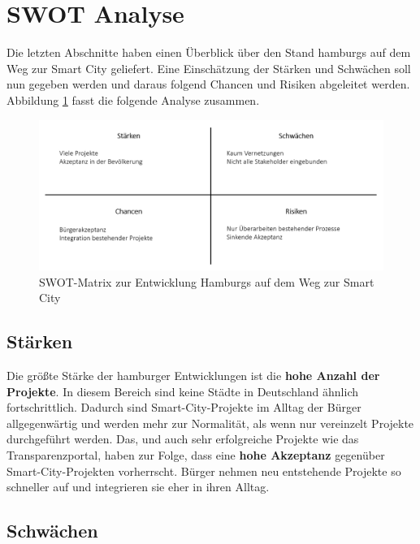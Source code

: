 \section{SWOT Analyse}
\label{sec:swot_analyse}

Die letzten Abschnitte haben einen Überblick über den Stand hamburgs auf dem Weg zur Smart City geliefert. Eine Einschätzung der Stärken und Schwächen soll nun gegeben werden und daraus folgend Chancen und Risiken abgeleitet werden. Abbildung \ref{fig:5_swot_matrix} fasst die folgende Analyse zusammen.

\begin{figure}[h]
	\includegraphics[width=\textwidth]{graphics/5-swot-matrix}
	\caption[SWOT-Matrix zur Entwicklung Hamburgs auf dem Weg zur Smart City]{SWOT-Matrix zur Entwicklung Hamburgs auf dem Weg zur Smart City}
	\label{fig:5_swot_matrix}
\end{figure}

\subsection{Stärken}

Die größte Stärke der hamburger Entwicklungen ist die \textbf{hohe Anzahl der Projekte}. In diesem Bereich sind keine Städte in Deutschland ähnlich fortschrittlich. Dadurch sind Smart-City-Projekte im Alltag der Bürger allgegenwärtig und werden mehr zur Normalität, als wenn nur vereinzelt Projekte durchgeführt werden. Das, und auch sehr erfolgreiche Projekte wie das Transparenzportal, haben zur Folge, dass eine \textbf{hohe Akzeptanz }gegenüber Smart-City-Projekten vorherrscht. Bürger nehmen neu entstehende Projekte so schneller auf und integrieren sie eher in ihren Alltag.

\subsection{Schwächen}

